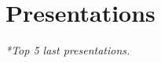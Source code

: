 \documentclass[print]{styles/friggeri-cv-mac} %
\begin{document}
%
%




\section{Presentations}\vspace{-5pt}
\textit{\small{*Top 5 last presentations.}}

\end{document}
